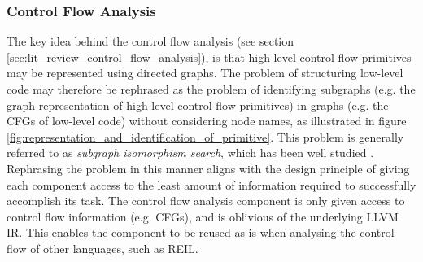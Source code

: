 
\subsubsection{Control Flow Analysis}
\label{sec:design_control_flow_analysis}

The key idea behind the control flow analysis (see section \ref{sec:lit_review_control_flow_analysis}), is that high-level control flow primitives may be represented using directed graphs. The problem of structuring low-level code may therefore be rephrased as the problem of identifying subgraphs (e.g. the graph representation of high-level control flow primitives) in graphs (e.g. the CFGs of low-level code) without considering node names, as illustrated in figure \ref{fig:representation_and_identification_of_primitive}. This problem is generally referred to as \textit{subgraph isomorphism search}, which has been well studied \cite{subgraph_isomorphism_algorithms}. Rephrasing the problem in this manner aligns with the design principle of giving each component access to the least amount of information required to successfully accomplish its task. The control flow analysis component is only given access to control flow information (e.g. CFGs), and is oblivious of the underlying LLVM IR. This enables the component to be reused as-is when analysing the control flow of other languages, such as REIL.

